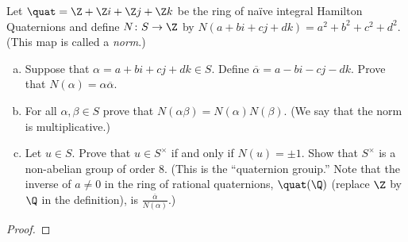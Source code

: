 \documentclass[10pt]{amsart}
\begin{document}
\begin{thm}
  Let $\quat = \Z + \Z i + \Z j + \Z k$ be the ring of na\"{i}ve integral Hamilton Quaternions and define $N \colon S \rightarrow \Z$ by $N(a + bi + cj + dk) = a^2 + b^2 + c^2 + d^2$.
  (This map is called a {\it norm}.)
  \begin{enumerate}[(a)]
  \item
    Suppose that $\alpha = a + bi + cj + dk \in S$.
    Define $\overline{\alpha} = a - bi - cj - dk$.
    Prove that $N(\alpha) = \alpha \overline{\alpha}$.
  \item
    For all $\alpha, \beta \in S$ prove that $N(\alpha\beta) = N(\alpha)N(\beta)$.
    (We say that the norm is multiplicative.)
  \item
    Let $u \in S$.
    Prove that $u \in S^\times$ if and only if $N(u) = \pm 1$.
    Show that $S^\times$ is a non-abelian group of order 8.
    (This is the ``quaternion grouip.''
    Note that the inverse of $a \neq 0$ in the ring of rational quaternions, $\quat(\Q)$ (replace $\Z$ by $\Q$ in the definition), is $\frac{\overline{\alpha}}{N(\alpha)}$.)
  \end{enumerate}
  \begin{proof}
  \end{proof}
\end{thm}
\end{document}
